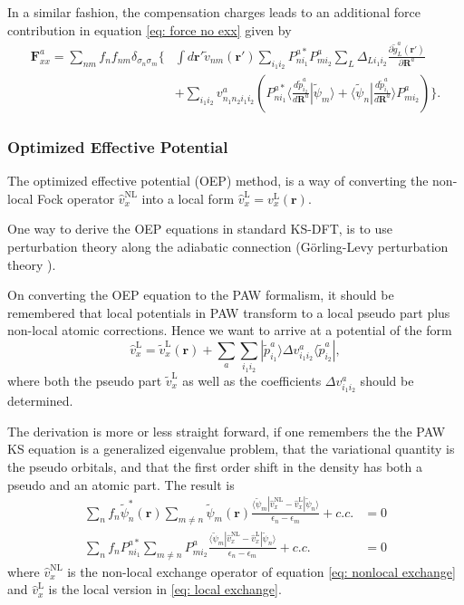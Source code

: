\documentclass[a4paper]{article}
\newcommand{\s}[1]{\tilde{#1}}
\newcommand{\h}[1]{\hat{#1}}
\newcommand{\br}{\mathbf{r}}
\newcommand{\bR}{\mathbf{R}}
\newcommand{\bra}[1]{\langle #1 |}
\newcommand{\ket}[1]{| #1 \rangle}
\newcommand{\braket}[2]{\langle #1 | #2 \rangle}
\newcommand{\psit}{\tilde{\psi}}
\newcommand{\pt}{\tilde{p}}
\begin{document}
In a similar fashion, the compensation charges leads to an additional
force contribution in equation \ref{eq: force no exx} given by
\begin{equation}\label{eq:paw-exx-force}
  \begin{split}
    \mathbf{F}^a_{xx} = \sum_{nm} f_{n}f_{nm}\delta_{\sigma_{n} \sigma_{m}}\Bigg\{ &\int d\br' \tilde{v}_{nm}(\br') \sum_{i_1i_2} P^{a*}_{ni_1}P^{a}_{mi_2}\sum_L\Delta_{Li_1i_2}\frac{\partial \tilde{g}^a_L(\br')}{\partial \bR^a}\\
    & + \sum_{i_1i_2} v^a_{n_1n_2i_1i_2}\left( P^{a*}_{n
        i_1}\braket{\frac{d \pt^a_{i_2}}{d\bR^a}}{\psit_{m}} +
      \braket{\psit_{n}}{\frac{d \pt^a_{i_1}}{d\bR^a}} P^a_{m i_2}
    \right)\Bigg\}.
  \end{split}
\end{equation}

\subsubsection{Optimized Effective Potential}
The optimized effective potential (OEP) method, is a way of converting
the non-local Fock operator $\hat{v}^\text{NL}_x$ into a local form
$\hat{v}^\text{L}_x = v^\text{L}_x(\br)$.

One way to derive the OEP equations in standard KS-DFT, is to use
perturbation theory along the adiabatic connection (G\"orling-Levy
perturbation theory \cite{Gorling1994}).

On converting the OEP equation to the PAW formalism, it should be
remembered that local potentials in PAW transform to a local pseudo
part plus non-local atomic corrections. Hence we want to arrive at a
potential of the form
\begin{equation}\label{eq: local exchange}
  \h{v}_x^\text{L} = \s{v}_x^\text{L}(\br) + \sum_a \sum_{i_1i_2} \ket{\s{p}_{i_1}^a}\Delta v_{i_1i_2}^a \bra{\s{p}_{i_2}^a},
\end{equation}
where both the pseudo part $\s{v}_x^\text{L}$ as well as the
coefficients $\Delta v_{i_1i_2}^a$ should be determined.

The derivation is more or less straight forward, if one remembers the
the PAW KS equation is a generalized eigenvalue problem, that the
variational quantity is the pseudo orbitals, and that the first order
shift in the density has both a pseudo and an atomic part. The result is
\begin{subequations}\label{eq: paw oep2}
\begin{align}
  \sum_n f_n \s{\psi}_n^*(\br) \sum_{m\neq n} \s{\psi}_m(\br) \frac{\bra{\s{\psi}_m} \h{v}_x^\text{NL} - \h{v}_x^\text{L} \ket{\s{\psi}_n}}{\epsilon_n - \epsilon_m}  + c.c. &= 0\\
  \sum_n f_n P_{ni_1}^{a*}\sum_{m\neq n}P_{mi_2}^{a}
  \frac{\bra{\s{\psi}_m} \h{v}_x^\text{NL} - \h{v}_x^\text{L}
    \ket{\s{\psi}_n}}{\epsilon_n - \epsilon_m} + c.c. &= 0
\end{align}
\end{subequations}
where $\hat{v}^\text{NL}_x$ is the non-local exchange operator of
equation \ref{eq: nonlocal exchange} and $\hat{v}^\text{L}_x$ is the
local version in \ref{eq: local exchange}.
\end{document}
